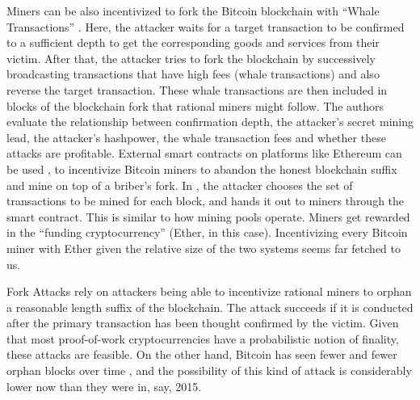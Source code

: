 Miners can be also incentivized to fork the Bitcoin blockchain with ``Whale Transactions'' \cite{whale_transactions}. Here, the attacker waits for a target transaction to be confirmed to a sufficient depth to get the corresponding goods and services from their victim. After that, the attacker tries to fork the blockchain by successively broadcasting transactions that have high fees (whale transactions) and also reverse the target transaction. These whale transactions are then included in blocks of the blockchain fork that rational miners might follow. The authors evaluate the relationship between confirmation depth, the attacker's secret mining lead, the attacker's hashpower, the whale transaction fees and whether these attacks are profitable. External smart contracts on platforms like Ethereum can be used \cite{smart_contracts_for_bribing}, \cite{pay_to_win} to incentivize Bitcoin miners to abandon the honest blockchain suffix and mine on top of a briber's fork. In \cite{pay_to_win}, the attacker chooses the set of transactions to be mined for each block, and hands it out to miners through the smart contract. This is similar to how mining pools operate. Miners get rewarded in the ``funding cryptocurrency'' (Ether, in this case). Incentivizing every Bitcoin miner with Ether given the relative size of the two systems seems far fetched to us.

Fork Attacks rely on attackers being able to incentivize rational miners to orphan a reasonable length suffix of the blockchain. The attack succeeds if it is conducted after the primary transaction has been thought confirmed by the victim. Given that most proof-of-work cryptocurrencies have a probabilistic notion of finality, these attacks are feasible. On the other hand, Bitcoin has seen fewer and fewer orphan blocks over time \cite{orphans}, and the possibility of this kind of attack is considerably lower now than they were in, say, 2015. 

